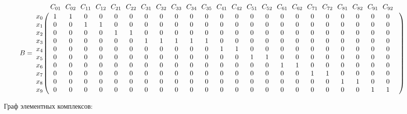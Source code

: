 \documentclass{article}
\begin{document}
$$
B =
\bordermatrix{ & C_{01} \!&\! C_{02} \!&\! C_{11} \!&\! C_{12} \!&\! C_{21} \!&\! C_{22} \!&\! C_{31} \!&\! C_{32} \!&\! C_{33} \!&\! C_{34} \!&\! C_{35} \!&\! C_{41} \!&\! C_{42} \!&\! C_{51} \!&\! C_{52} \!&\! C_{61} \!&\! C_{62} \!&\! C_{71} \!&\! C_{72} \!&\! C_{81} \!&\! C_{82} \!&\! C_{91} \!&\! C_{92} \!&\! \cr 
x_{0} \!&\! 1 \!&\! 1 \!&\! 0 \!&\! 0 \!&\! 0 \!&\! 0 \!&\! 0 \!&\! 0 \!&\! 0 \!&\! 0 \!&\! 0 \!&\! 0 \!&\! 0 \!&\! 0 \!&\! 0 \!&\! 0 \!&\! 0 \!&\! 0 \!&\! 0 \!&\! 0 \!&\! 0 \!&\! 0 \!&\! 0 \!&\! \cr
x_{1} \!&\! 0 \!&\! 0 \!&\! 1 \!&\! 1 \!&\! 0 \!&\! 0 \!&\! 0 \!&\! 0 \!&\! 0 \!&\! 0 \!&\! 0 \!&\! 0 \!&\! 0 \!&\! 0 \!&\! 0 \!&\! 0 \!&\! 0 \!&\! 0 \!&\! 0 \!&\! 0 \!&\! 0 \!&\! 0 \!&\! 0 \!&\! \cr
x_{2} \!&\! 0 \!&\! 0 \!&\! 0 \!&\! 0 \!&\! 1 \!&\! 1 \!&\! 0 \!&\! 0 \!&\! 0 \!&\! 0 \!&\! 0 \!&\! 0 \!&\! 0 \!&\! 0 \!&\! 0 \!&\! 0 \!&\! 0 \!&\! 0 \!&\! 0 \!&\! 0 \!&\! 0 \!&\! 0 \!&\! 0 \!&\! \cr
x_{3} \!&\! 0 \!&\! 0 \!&\! 0 \!&\! 0 \!&\! 0 \!&\! 0 \!&\! 1 \!&\! 1 \!&\! 1 \!&\! 1 \!&\! 1 \!&\! 0 \!&\! 0 \!&\! 0 \!&\! 0 \!&\! 0 \!&\! 0 \!&\! 0 \!&\! 0 \!&\! 0 \!&\! 0 \!&\! 0 \!&\! 0 \!&\! \cr
x_{4} \!&\! 0 \!&\! 0 \!&\! 0 \!&\! 0 \!&\! 0 \!&\! 0 \!&\! 0 \!&\! 0 \!&\! 0 \!&\! 0 \!&\! 0 \!&\! 1 \!&\! 1 \!&\! 0 \!&\! 0 \!&\! 0 \!&\! 0 \!&\! 0 \!&\! 0 \!&\! 0 \!&\! 0 \!&\! 0 \!&\! 0 \!&\! \cr
x_{5} \!&\! 0 \!&\! 0 \!&\! 0 \!&\! 0 \!&\! 0 \!&\! 0 \!&\! 0 \!&\! 0 \!&\! 0 \!&\! 0 \!&\! 0 \!&\! 0 \!&\! 0 \!&\! 1 \!&\! 1 \!&\! 0 \!&\! 0 \!&\! 0 \!&\! 0 \!&\! 0 \!&\! 0 \!&\! 0 \!&\! 0 \!&\! \cr
x_{6} \!&\! 0 \!&\! 0 \!&\! 0 \!&\! 0 \!&\! 0 \!&\! 0 \!&\! 0 \!&\! 0 \!&\! 0 \!&\! 0 \!&\! 0 \!&\! 0 \!&\! 0 \!&\! 0 \!&\! 0 \!&\! 1 \!&\! 1 \!&\! 0 \!&\! 0 \!&\! 0 \!&\! 0 \!&\! 0 \!&\! 0 \!&\! \cr
x_{7} \!&\! 0 \!&\! 0 \!&\! 0 \!&\! 0 \!&\! 0 \!&\! 0 \!&\! 0 \!&\! 0 \!&\! 0 \!&\! 0 \!&\! 0 \!&\! 0 \!&\! 0 \!&\! 0 \!&\! 0 \!&\! 0 \!&\! 0 \!&\! 1 \!&\! 1 \!&\! 0 \!&\! 0 \!&\! 0 \!&\! 0 \!&\! \cr
x_{8} \!&\! 0 \!&\! 0 \!&\! 0 \!&\! 0 \!&\! 0 \!&\! 0 \!&\! 0 \!&\! 0 \!&\! 0 \!&\! 0 \!&\! 0 \!&\! 0 \!&\! 0 \!&\! 0 \!&\! 0 \!&\! 0 \!&\! 0 \!&\! 0 \!&\! 0 \!&\! 1 \!&\! 1 \!&\! 0 \!&\! 0 \!&\! \cr
x_{9} \!&\! 0 \!&\! 0 \!&\! 0 \!&\! 0 \!&\! 0 \!&\! 0 \!&\! 0 \!&\! 0 \!&\! 0 \!&\! 0 \!&\! 0 \!&\! 0 \!&\! 0 \!&\! 0 \!&\! 0 \!&\! 0 \!&\! 0 \!&\! 0 \!&\! 0 \!&\! 0 \!&\! 0 \!&\! 1 \!&\! 1 \!&\! \cr
}$$

Граф элементных комплексов:
\end{document}
